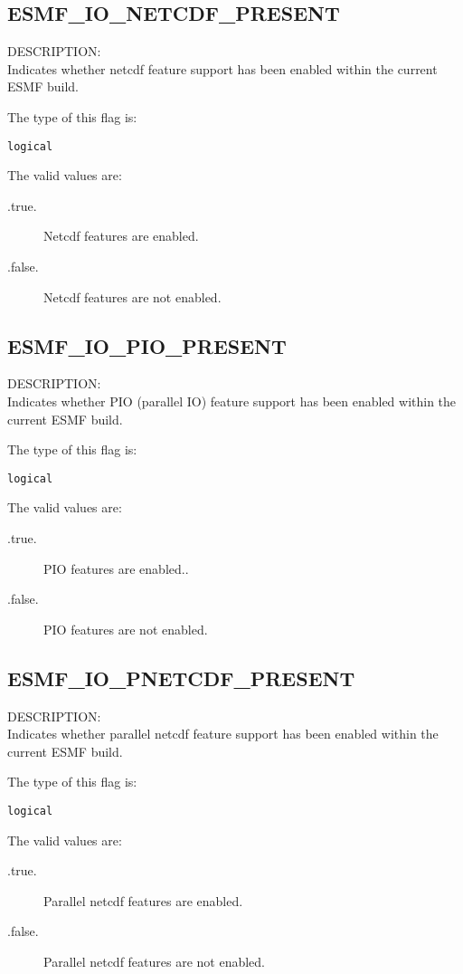 \subsection{ESMF\_IO\_NETCDF\_PRESENT}
\label{const:ionetcdfflag}
{\sf DESCRIPTION:\\}
Indicates whether netcdf feature support has been enabled
within the current ESMF build.

The type of this flag is:

{\tt logical}

The valid values are:
\begin{description}
\item [.true.]
      Netcdf features are enabled.
\item [.false.]
      Netcdf features are not enabled.
\end{description}

\subsection{ESMF\_IO\_PIO\_PRESENT}
\label{const:iopioflag}
{\sf DESCRIPTION:\\}
Indicates whether PIO (parallel IO) feature support has been enabled
within the current ESMF build.

The type of this flag is:

{\tt logical}

The valid values are:
\begin{description}
\item [.true.]
      PIO features are enabled..
\item [.false.]
      PIO  features are not enabled.
\end{description}

\subsection{ESMF\_IO\_PNETCDF\_PRESENT}
\label{const:iopnetcdfflag}
{\sf DESCRIPTION:\\}
Indicates whether parallel netcdf feature support has been enabled
within the current ESMF build.

The type of this flag is:

{\tt logical}

The valid values are:
\begin{description}
\item [.true.]
      Parallel netcdf features are enabled.
\item [.false.]
      Parallel netcdf features are not enabled.
\end{description}


